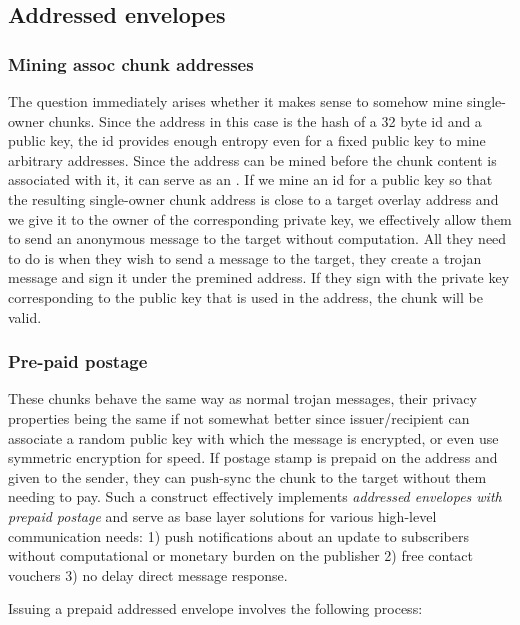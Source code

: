 \subsection{Addressed envelopes}\label{sec:addressed-envelopes}

\subsubsection{Mining assoc chunk addresses}
The question immediately arises whether it makes sense to somehow mine single-owner chunks. Since the address in this case is the hash of a 32 byte id and a public key, the id provides enough entropy even for a fixed public key to mine arbitrary addresses. Since the address can be mined before the chunk content is associated with it, it can serve as an . If we mine an id for a public key so that the resulting single-owner chunk address is close to a target overlay address and we give it to the owner of the corresponding private key, we effectively allow them to send an anonymous message to the target without computation. All they need to do is when they wish to send a message to the target, they create a trojan message and sign it under the premined address. If they sign with the private key corresponding to the public key that is used in the address, the chunk will be valid.

\subsubsection{Pre-paid postage}

These chunks behave the same way as normal trojan messages, their privacy properties being the same if not somewhat better since issuer/recipient can associate a random public key with which the message is encrypted, or even use symmetric encryption for speed. If postage stamp is prepaid on the address and given to the sender, they can push-sync the chunk to the target without them needing to pay. Such a construct effectively implements \emph{addressed envelopes with prepaid postage} and serve as base layer solutions for various high-level communication needs: 1) push notifications about an update to subscribers without computational or monetary burden on the publisher 2) free contact vouchers 3) no delay direct message response.  

Issuing a prepaid addressed envelope involves the following process:

